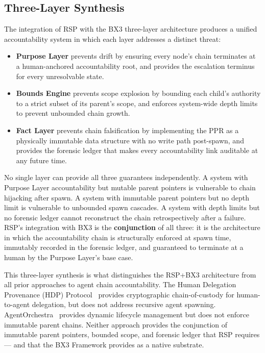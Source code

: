 
\subsection{Three-Layer Synthesis}
\label{sec:three-layer-synthesis}

The integration of RSP with the BX3 three-layer architecture produces a unified accountability system in which each layer addresses a distinct threat:

\begin{itemize}

\item \textbf{Purpose Layer} prevents drift by ensuring every node's chain terminates at a human-anchored accountability root, and provides the escalation terminus for every unresolvable state.

\item \textbf{Bounds Engine} prevents scope explosion by bounding each child's authority to a strict subset of its parent's scope, and enforces system-wide depth limits to prevent unbounded chain growth.

\item \textbf{Fact Layer} prevents chain falsification by implementing the PPR as a physically immutable data structure with no write path post-spawn, and provides the forensic ledger that makes every accountability link auditable at any future time.

\end{itemize}

No single layer can provide all three guarantees independently. A system with Purpose Layer accountability but mutable parent pointers is vulnerable to chain hijacking after spawn. A system with immutable parent pointers but no depth limit is vulnerable to unbounded spawn cascades. A system with depth limits but no forensic ledger cannot reconstruct the chain retrospectively after a failure. RSP's integration with BX3 is the \textbf{conjunction} of all three: it is the architecture in which the accountability chain is structurally enforced at spawn time, immutably recorded in the forensic ledger, and guaranteed to terminate at a human by the Purpose Layer's base case.

This three-layer synthesis is what distinguishes the RSP+BX3 architecture from all prior approaches to agent chain accountability. The Human Delegation Provenance (HDP) Protocol~\cite{hdp2026} provides cryptographic chain-of-custody for human-to-agent delegation, but does not address recursive agent spawning. AgentOrchestra~\cite{agentorchestra2025} provides dynamic lifecycle management but does not enforce immutable parent chains. Neither approach provides the conjunction of immutable parent pointers, bounded scope, and forensic ledger that RSP requires — and that the BX3 Framework provides as a native substrate.

